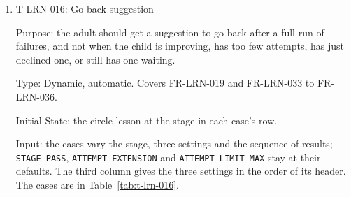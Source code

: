 \documentclass[12pt, titlepage]{article}
\newcommand{\testitem}[1]{\item #1\par\nopagebreak}
\begin{document}
\begin{enumerate}
Output: the expected output of each case is in its row of
Table~\ref{tab:t-lrn-015}; the test passes when every case gives it.

Test Case Derivation: the fit criterion asks for each discretionary change
without and with authorization, plus pass-based advance with no adult
action. The cases also follow invariants I1 and I2 in SRS Section~9.2. (d)
and (e) try paths around the interface, as T-SAF-001 does for SAF-RAY-001.

How test will be performed: Playwright. The server requests are sent with
the child's session.

\testitem{T-LRN-016: Go-back suggestion}

Purpose: the adult should get a suggestion to go back after a full run of
failures, and not when the child is improving, has too few attempts, has
just declined one, or still has one waiting.

Type: Dynamic, automatic. Covers FR-LRN-019 and FR-LRN-033 to FR-LRN-036.

Initial State: the circle lesson at the stage in each case's row.

Input: the cases vary the stage, three settings and the sequence of
results; \texttt{STAGE\_PASS}, \texttt{ATTEMPT\_EXTENSION} and
\texttt{ATTEMPT\_LIMIT\_MAX} stay at their defaults. The third column
gives the three settings in the order of its header. The cases are in
Table~\ref{tab:t-lrn-016}.


\end{enumerate}
\end{document}
